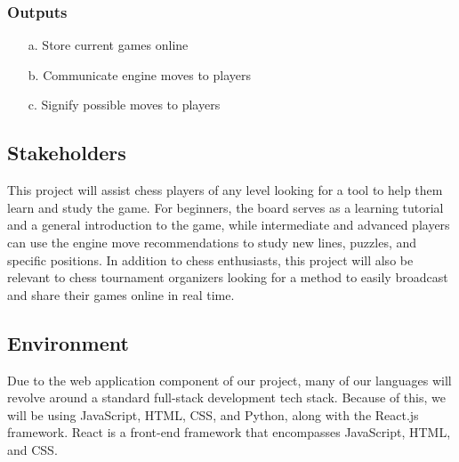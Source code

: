 \documentclass{article}
\begin{document}
\subsubsection{Outputs}
\begin{enumerate}
    \item[a.] Store current games online
    \item[b.] Communicate engine moves to players
    \item[c.] Signify possible moves to players
\end{enumerate}

\subsection{Stakeholders}
{This project will assist chess players of any level looking for a tool to help them learn and study the game. 
For beginners, the board serves as a learning tutorial and a general introduction to the game, while intermediate and advanced players can use the engine move recommendations to study new lines, puzzles, and specific positions. 
In addition to chess enthusiasts, this project will also be relevant to chess tournament organizers looking for a method to easily broadcast and share their games online in real time. }

\subsection{Environment}
{Due to the web application component of our project, many of our languages will revolve around a standard full-stack development tech stack. 
Because of this, we will be using JavaScript, HTML, CSS, and Python, along with the React.js framework. React is a front-end framework that encompasses JavaScript, HTML, and CSS.}

\medskip
{}

\medskip
{}
\end{document}
